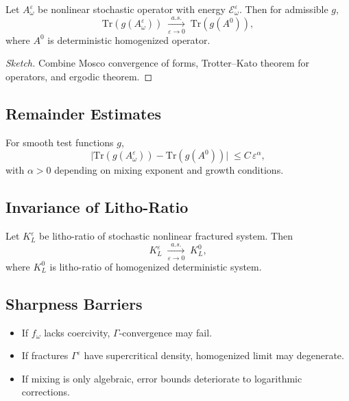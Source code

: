 \begin{theorem}
Let $A^\varepsilon_\omega$ be nonlinear stochastic operator with energy $\mathcal{E}^\varepsilon_\omega$.  
Then for admissible $g$,
\[
\mathrm{Tr}(g(A^\varepsilon_\omega))
\;\xrightarrow[\varepsilon\to 0]{a.s.}\;
\mathrm{Tr}(g(A^0)),
\]
where $A^0$ is deterministic homogenized operator.  
\end{theorem}

\begin{proof}[Sketch]
Combine Mosco convergence of forms, Trotter–Kato theorem for operators, and ergodic theorem.  
\end{proof}

\subsection{Remainder Estimates}

\begin{proposition}
For smooth test functions $g$,
\[
\Big|\mathrm{Tr}(g(A^\varepsilon_\omega)) - \mathrm{Tr}(g(A^0))\Big|
\;\leq C\,\varepsilon^\alpha,
\]
with $\alpha>0$ depending on mixing exponent and growth conditions.  
\end{proposition}

\subsection{Invariance of Litho-Ratio}

\begin{theorem}
Let $K_L^\varepsilon$ be litho-ratio of stochastic nonlinear fractured system. Then
\[
K_L^\varepsilon \;\xrightarrow[\varepsilon\to 0]{a.s.}\; K_L^0,
\]
where $K_L^0$ is litho-ratio of homogenized deterministic system.  
\end{theorem}

\subsection{Sharpness Barriers}

\begin{sharpness}
\begin{itemize}
  \item If $f_\omega$ lacks coercivity, $\Gamma$-convergence may fail.  
  \item If fractures $\Gamma^\varepsilon$ have supercritical density, homogenized limit may degenerate.  
  \item If mixing is only algebraic, error bounds deteriorate to logarithmic corrections.  
\end{itemize}
\end{sharpness}


